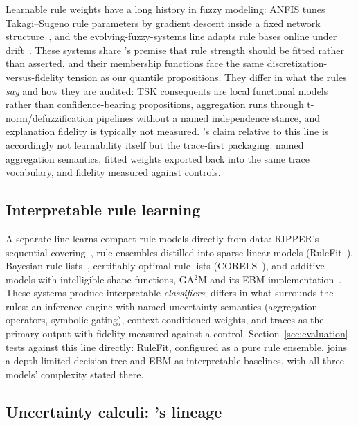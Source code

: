 Learnable rule weights have a long history in fuzzy modeling: ANFIS
tunes Takagi--Sugeno rule parameters by gradient descent inside a fixed
network structure~\cite{jang1993}, and the evolving-fuzzy-systems line
adapts rule bases online under drift~\cite{skrjanc2019}. These systems
share \pla{}'s premise that rule strength should be fitted rather than
asserted, and their membership functions face the same
discretization-versus-fidelity tension as our quantile propositions.
They differ in what the rules \emph{say} and how they are audited:
TSK consequents are local functional models rather than
confidence-bearing propositions, aggregation runs through
t-norm/defuzzification pipelines without a named independence stance,
and explanation fidelity is typically not measured. \pla{}'s claim
relative to this line is accordingly not learnability itself but the
trace-first packaging: named aggregation semantics, fitted weights
exported back into the same trace vocabulary, and fidelity measured
against controls.

\subsection{Interpretable rule learning}

A separate line learns compact rule models directly from data: RIPPER's
sequential covering~\cite{cohen1995}, rule ensembles distilled into
sparse linear models (RuleFit~\cite{friedman2008}), Bayesian rule
lists~\cite{letham2015}, certifiably optimal rule lists
(CORELS~\cite{angelino2018}), and additive models with intelligible
shape functions, GA$^2$M and its EBM
implementation~\cite{lou2013,nori2019}. These systems
produce interpretable \emph{classifiers}; \pla{} differs in what
surrounds the rules: an inference engine with named uncertainty
semantics (aggregation operators, symbolic gating), context-conditioned
weights, and traces as the primary output with fidelity measured against
a control. Section~\ref{sec:evaluation} tests against this line
directly: RuleFit, configured as a pure rule ensemble, joins a
depth-limited decision tree and EBM as
interpretable baselines, with all three models' complexity stated
there.

\subsection{Uncertainty calculi: \pla{}'s lineage}

